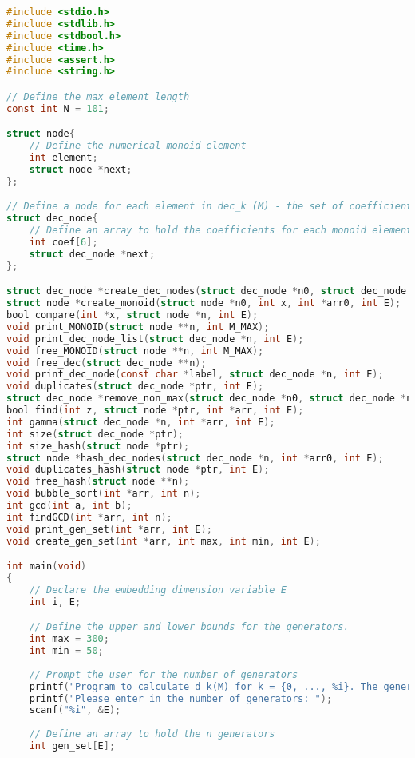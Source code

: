 \begin{lstlisting}[language=C]
#include <stdio.h>
#include <stdlib.h>
#include <stdbool.h>
#include <time.h>
#include <assert.h>
#include <string.h>

// Define the max element length
const int N = 101;

struct node{
    // Define the numerical monoid element
    int element;
    struct node *next;
};

// Define a node for each element in dec_k (M) - the set of coefficients for each maximal decomposition of length k.
struct dec_node{
    // Define an array to hold the coefficients for each monoid element
    int coef[6];
    struct dec_node *next;
};

struct dec_node *create_dec_nodes(struct dec_node *n0, struct dec_node *n1, int *arr0, struct node **arr1, int E, int k);
struct node *create_monoid(struct node *n0, int x, int *arr0, int E);
bool compare(int *x, struct node *n, int E);
void print_MONOID(struct node **n, int M_MAX);
void print_dec_node_list(struct dec_node *n, int E);
void free_MONOID(struct node **n, int M_MAX);
void free_dec(struct dec_node **n);
void print_dec_node(const char *label, struct dec_node *n, int E);
void duplicates(struct dec_node *ptr, int E);
struct dec_node *remove_non_max(struct dec_node *n0, struct dec_node *n1, int *arr0, struct node **arr1, int E, int k);
bool find(int z, struct node *ptr, int *arr, int E);
int gamma(struct dec_node *n, int *arr, int E);
int size(struct dec_node *ptr);
int size_hash(struct node *ptr);
struct node *hash_dec_nodes(struct dec_node *n, int *arr0, int E);
void duplicates_hash(struct node *ptr, int E);
void free_hash(struct node **n);
void bubble_sort(int *arr, int n);
int gcd(int a, int b);
int findGCD(int *arr, int n);
void print_gen_set(int *arr, int E);
void create_gen_set(int *arr, int max, int min, int E);

int main(void)
{
    // Declare the embedding dimension variable E
    int i, E;

    // Define the upper and lower bounds for the generators.
    int max = 300;
    int min = 50;
    
    // Prompt the user for the number of generators
    printf("Program to calculate d_k(M) for k = {0, ..., %i}. The generators will be between %i and %i inclusive.\n", N - 1, min, max);
    printf("Please enter in the number of generators: ");
    scanf("%i", &E);
    
    // Define an array to hold the n generators
    int gen_set[E];


\end{lstlisting}
